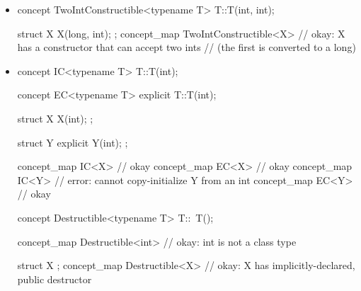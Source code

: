 \documentclass[american]{book}
\begin{document}
\begin{paras}
\begin{itemize}

\item {} 
  \addedConcepts{\enterexample}
\begin{codeblock}
concept TwoIntConstructible<typename T> {
  T::T(int, int);
}

struct X { X(long, int); };
concept_map TwoIntConstructible<X> { } // okay: X has a constructor that can accept two ints 
                                       // (the first is converted to a long)
\end{codeblock}
\addedConcepts{\exitexample}

\item {}
    \addedConcepts{\enterexample}
\begin{codeblock}
concept IC<typename T> {
  T::T(int);
}

concept EC<typename T> {
  explicit T::T(int);
}

struct X {
  X(int);
};

struct Y {
  explicit Y(int);
};

concept_map IC<X> { } // okay
concept_map EC<X> { } // okay
concept_map IC<Y> { } // error: cannot copy-initialize Y from an int
concept_map EC<Y> { } // okay
\end{codeblock}
\addedConcepts{\exitexample}

\addedConcepts{\enterexample}
\begin{codeblock}
concept Destructible<typename T> {
  T::~T();
}

concept_map Destructible<int> { } // okay: int is not a class type

struct X { };
concept_map Destructible<X> { } // okay: X has implicitly-declared, public destructor


\end{codeblock}
\end{itemize}
\end{paras}
\end{document}
